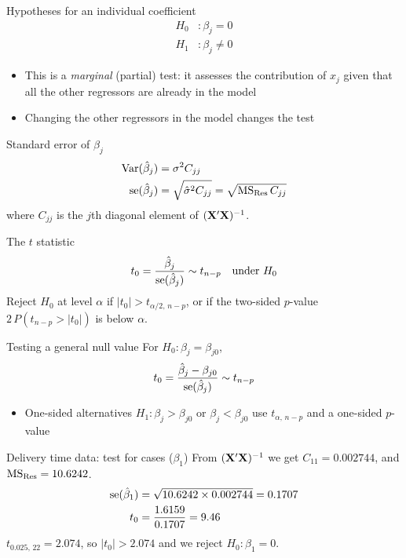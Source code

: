 \begin{frame}{Hypotheses for an individual coefficient}
    \begin{align*}
        H_0 &: \beta_j = 0 \\
        H_1 &: \beta_j \neq 0
    \end{align*}
    \begin{itemize}
        \item This is a \emph{marginal} (partial) test: it assesses the contribution of $x_j$ given that all the other regressors are already in the model
        \item Changing the other regressors in the model changes the test
    \end{itemize}
\end{frame}


\begin{frame}{Standard error of $\hat\beta_j$}
    \begin{align*}
        \operatorname{Var}(\hat\beta_j) &= \sigma^2 C_{jj} \\
        \operatorname{se}(\hat\beta_j) &= \sqrt{\hat\sigma^2 C_{jj}} = \sqrt{\mathrm{MS}_{\mathrm{Res}}\, C_{jj}}
    \end{align*}
    where $C_{jj}$ is the $j$th diagonal element of $(\mathbf{X}'\mathbf{X})^{-1}$.
\end{frame}


\begin{frame}{The $t$ statistic}
    \begin{align*}
        t_0 = \frac{\hat\beta_j}{\operatorname{se}(\hat\beta_j)} \sim t_{n-p} \quad \text{under } H_0
    \end{align*}
    Reject $H_0$ at level $\alpha$ if $|t_0| > t_{\alpha/2,\,n-p}$, or if the two-sided $p$-value $2\,P(t_{n-p} > |t_0|)$ is below $\alpha$.
\end{frame}


\begin{frame}{Testing a general null value}
    For $H_0: \beta_j = \beta_{j0}$,
    \begin{align*}
        t_0 = \frac{\hat\beta_j - \beta_{j0}}{\operatorname{se}(\hat\beta_j)} \sim t_{n-p}
    \end{align*}
    \begin{itemize}
        \item One-sided alternatives $H_1: \beta_j > \beta_{j0}$ or $\beta_j < \beta_{j0}$ use $t_{\alpha,\,n-p}$ and a one-sided $p$-value
    \end{itemize}
\end{frame}


\begin{frame}{Delivery time data: test for cases ($\beta_1$)}
    From $(\mathbf{X}'\mathbf{X})^{-1}$ we get $C_{11} = 0.002744$, and $\mathrm{MS}_{\mathrm{Res}} = 10.6242$.
    \begin{align*}
        \operatorname{se}(\hat\beta_1) &= \sqrt{10.6242 \times 0.002744} = 0.1707 \\
        t_0 &= \frac{1.6159}{0.1707} = 9.46
    \end{align*}
    $t_{0.025,\,22} = 2.074$, so $|t_0| > 2.074$ and we reject $H_0: \beta_1 = 0$.
\end{frame}


